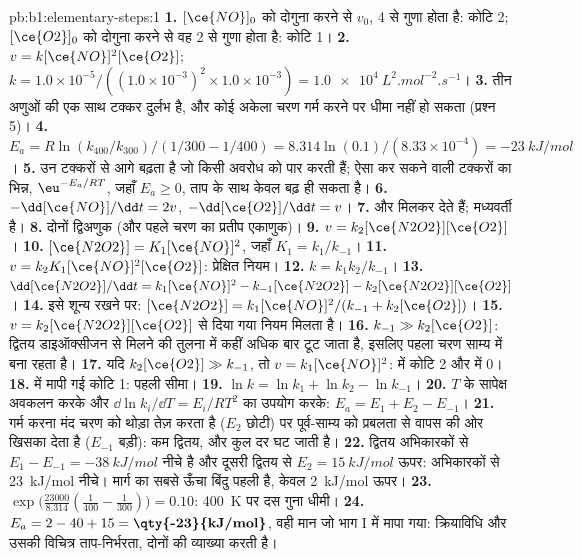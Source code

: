 \begin{solution}{pb:b1:elementary-steps:1}
\textbf{1.} $[\ce{NO}]_0$ को दोगुना करने से $v_0$, 4 से गुणा होता है: कोटि 2;
$[\ce{O2}]_0$ को दोगुना करने से वह 2 से गुणा होता है: कोटि 1।
\textbf{2.} $v = k[\ce{NO}]^2[\ce{O2}]$; $k = 1.0 \times 10^{-5}/((1.0
\times 10^{-3})^2 \times 1.0 \times 10^{-3}) =
\qty{1.0e4}{L^2.mol^{-2}.s^{-1}}$।
\textbf{3.} तीन अणुओं की एक साथ टक्कर दुर्लभ है, और कोई
अकेला चरण गर्म करने पर धीमा नहीं हो सकता (प्रश्न 5)।
\textbf{4.} $E_a = R\ln(k_{400}/k_{300})/(1/300 - 1/400) = 8.314 \ln(0.1)
/(8.33 \times 10^{-4}) = \qty{-23}{kJ/mol}$।
\textbf{5.}  उन टक्करों से आगे बढ़ता है जो किसी अवरोध को पार करती हैं;
ऐसा कर सकने वाली टक्करों का भिन्न, $\eu^{-E_a/RT}$, जहाँ $E_a \ge
0$, ताप के साथ केवल बढ़ ही सकता है।
\textbf{6.} $-\dd[\ce{NO}]/\dd t = 2v$, $-\dd[\ce{O2}]/\dd t = v$।
\textbf{7.}  और  मिलकर
 देते हैं; मध्यवर्ती  है।
\textbf{8.} दोनों द्विअणुक (और पहले चरण का प्रतीप एकाणुक)।
\textbf{9.} $v = k_2[\ce{N2O2}][\ce{O2}]$।
\textbf{10.} $[\ce{N2O2}] = K_1[\ce{NO}]^2$, जहाँ $K_1 = k_1/k_{-1}$।
\textbf{11.} $v = k_2K_1[\ce{NO}]^2[\ce{O2}]$: प्रेक्षित नियम।
\textbf{12.} $k = k_1k_2/k_{-1}$।
\textbf{13.} $\dd[\ce{N2O2}]/\dd t = k_1[\ce{NO}]^2 - k_{-1}[\ce{N2O2}] -
k_2[\ce{N2O2}][\ce{O2}]$।
\textbf{14.} इसे शून्य रखने पर: $[\ce{N2O2}] = k_1[\ce{NO}]^2/(k_{-1} +
k_2[\ce{O2}])$।
\textbf{15.} $v = k_2[\ce{N2O2}][\ce{O2}]$ से दिया गया नियम मिलता है।
\textbf{16.} $k_{-1} \gg k_2[\ce{O2}]$: द्वितय डाइऑक्सीजन से मिलने की तुलना में कहीं
अधिक बार टूट जाता है, इसलिए पहला चरण साम्य में बना रहता है।
\textbf{17.} यदि $k_2[\ce{O2}] \gg k_{-1}$, तो $v = k_1[\ce{NO}]^2$:  में
कोटि 2 और  में 0।
\textbf{18.}  में मापी गई कोटि 1: पहली सीमा।
\textbf{19.} $\ln k = \ln k_1 + \ln k_2 - \ln k_{-1}$।
\textbf{20.} $T$ के सापेक्ष अवकलन करके और $\dd\ln k_i/\dd T
= E_i/RT^2$ का उपयोग करके: $E_a = E_1 + E_2 - E_{-1}$।
\textbf{21.} गर्म करना मंद चरण को थोड़ा तेज़ करता है ($E_2$ छोटी) पर
पूर्व-साम्य को प्रबलता से वापस  की ओर खिसका देता है ($E_{-1}$ बड़ी): कम
द्वितय, और कुल दर घट जाती है।
\textbf{22.} द्वितय अभिकारकों से $E_1 - E_{-1} = \qty{-38}{kJ/mol}$ नीचे है
और दूसरी  द्वितय से $E_2 = \qty{15}{kJ/mol}$ ऊपर:
अभिकारकों से \qty{23}{kJ/mol} नीचे। मार्ग का सबसे ऊँचा बिंदु
पहली  है, केवल \qty{2}{kJ/mol} ऊपर।
\textbf{23.} $\exp\big(\frac{23000}{8.314}(\frac{1}{400} - \frac{1}{300})\big)
= 0.10$: \qty{400}{K} पर दस गुना धीमी।
\textbf{24.} $E_a = 2 - 40 + 15 = \textbf{\qty{-23}{kJ/mol}}$, वही मान
जो भाग I में मापा गया: क्रियाविधि  और उसकी
विचित्र ताप-निर्भरता, दोनों की व्याख्या करती है।
\end{solution}
